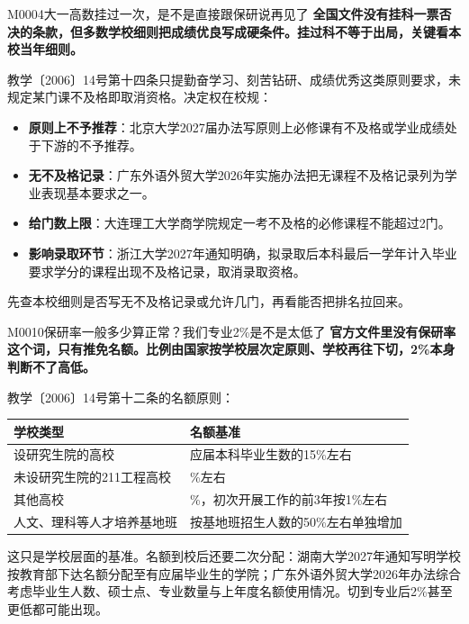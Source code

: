 \begin{qa}{M0004}{大一高数挂过一次，是不是直接跟保研说再见了}
\textbf{全国文件没有挂科一票否决的条款，但多数学校细则把成绩优良写成硬条件。挂过科不等于出局，关键看本校当年细则。}

教学〔2006〕14号第十四条只提勤奋学习、刻苦钻研、成绩优秀这类原则要求，未规定某门课不及格即取消资格。决定权在校规：

\begin{itemize}
  \item \textbf{原则上不予推荐}：北京大学2027届办法写原则上必修课有不及格或学业成绩处于下游的不予推荐。
  \item \textbf{无不及格记录}：广东外语外贸大学2026年实施办法把无课程不及格记录列为学业表现基本要求之一。
  \item \textbf{给门数上限}：大连理工大学商学院规定一考不及格的必修课程不能超过2门。
  \item \textbf{影响录取环节}：浙江大学2027年通知明确，拟录取后本科最后一学年计入毕业要求学分的课程出现不及格记录，取消录取资格。
\end{itemize}

先查本校细则是否写无不及格记录或允许几门，再看能否把排名拉回来。
\end{qa}

\begin{qa}{M0010}{保研率一般多少算正常？我们专业2\%是不是太低了}
\textbf{官方文件里没有保研率这个词，只有推免名额。比例由国家按学校层次定原则、学校再往下切，2\%本身判断不了高低。}

教学〔2006〕14号第十二条的名额原则：

\par\vspace{2pt}\nobreak\begin{center}\footnotesize
\begin{tabularx}{\textwidth}{>{\raggedright\arraybackslash}X>{\raggedright\arraybackslash}X}
\toprule
\textbf{学校类型} & \textbf{名额基准} \\ \midrule
设研究生院的高校 & 应届本科毕业生数的15\%左右 \\
未设研究生院的211工程高校 & 5\%左右 \\
其他高校 & 2\%，初次开展工作的前3年按1\%左右 \\
人文、理科等人才培养基地班 & 按基地班招生人数的50\%左右单独增加 \\
\bottomrule
\end{tabularx}
\end{center}\vspace{2pt}\par

这只是学校层面的基准。名额到校后还要二次分配：湖南大学2027年通知写明学校按教育部下达名额分配至有应届毕业生的学院；广东外语外贸大学2026年办法综合考虑毕业生人数、硕士点、专业数量与上年度名额使用情况。切到专业后2\%甚至更低都可能出现。
\end{qa}

